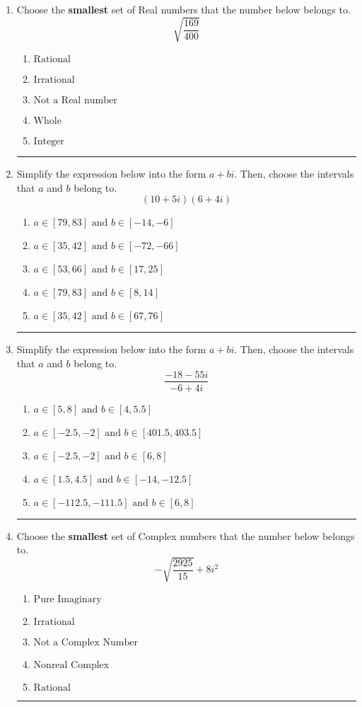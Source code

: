 \documentclass[14pt]{extbook}
\newcommand{\litem}[1]{\item#1\hspace*{-1cm}\rule{\textwidth}{0.4pt}}
\begin{document}
\begin{enumerate}
\litem{
Choose the \textbf{smallest} set of Real numbers that the number below belongs to.\[ \sqrt{\frac{169}{400}} \]\begin{enumerate}[label=\Alph*.]
\item \( \text{Rational} \)
\item \( \text{Irrational} \)
\item \( \text{Not a Real number} \)
\item \( \text{Whole} \)
\item \( \text{Integer} \)

\end{enumerate} }
\litem{
Simplify the expression below into the form $a+bi$. Then, choose the intervals that $a$ and $b$ belong to.\[ (10 + 5 i)(6 + 4 i) \]\begin{enumerate}[label=\Alph*.]
\item \( a \in [79, 83] \text{ and } b \in [-14, -6] \)
\item \( a \in [35, 42] \text{ and } b \in [-72, -66] \)
\item \( a \in [53, 66] \text{ and } b \in [17, 25] \)
\item \( a \in [79, 83] \text{ and } b \in [8, 14] \)
\item \( a \in [35, 42] \text{ and } b \in [67, 76] \)

\end{enumerate} }
\litem{
Simplify the expression below into the form $a+bi$. Then, choose the intervals that $a$ and $b$ belong to.\[ \frac{-18 - 55 i}{-6 + 4 i} \]\begin{enumerate}[label=\Alph*.]
\item \( a \in [5, 8] \text{ and } b \in [4, 5.5] \)
\item \( a \in [-2.5, -2] \text{ and } b \in [401.5, 403.5] \)
\item \( a \in [-2.5, -2] \text{ and } b \in [6, 8] \)
\item \( a \in [1.5, 4.5] \text{ and } b \in [-14, -12.5] \)
\item \( a \in [-112.5, -111.5] \text{ and } b \in [6, 8] \)

\end{enumerate} }
\litem{
Choose the \textbf{smallest} set of Complex numbers that the number below belongs to.\[ -\sqrt{\frac{2925}{15}}+8i^2 \]\begin{enumerate}[label=\Alph*.]
\item \( \text{Pure Imaginary} \)
\item \( \text{Irrational} \)
\item \( \text{Not a Complex Number} \)
\item \( \text{Nonreal Complex} \)
\item \( \text{Rational} \)


\end{enumerate}}
\end{enumerate}
\end{document}
